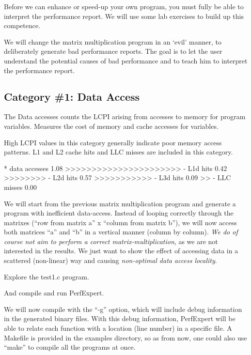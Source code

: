 Before we can enhance or speed-up your own program, you must fully be able to interpret the performance report. We will use some lab exercises to build up this competence.

We will change the matrix multiplication program in an `evil' manner, to deliberately generate bad performance reports. The goal is to let the user understand the potential causes of bad performance and to teach him to interpret the performance report.

\subsection{Category \#1: Data Access}
\label{subsec:CAT1_Data_Access}

The Data accesses counts the LCPI arising from accesses to memory for program variables. Measures the cost of memory and cache accesses for variables.

High LCPI values in this category generally indicate poor memory access patterns. L1 and L2 cache hits and LLC misses are included in this category.

\begin{prompt}
* data accesses          1.08 >>>>>>>>>>>>>>>>>>>>>>
  - L1d hits             0.42 >>>>>>>>
  - L2d hits             0.57 >>>>>>>>>>>
  - L3d hits             0.09 >>
  - LLC misses           0.00
\end{prompt}

We will start from the previous matrix multiplication program and generate a program with inefficient data-access. Instead of looping correctly through the matrixes (``row from matrix a'' x ``column from matrix b''), we will now access both matrices ``a'' and ``b'' in a vertical manner (column by column). \emph{We do of course not aim to perform a correct matrix-multiplication}, as we are not interested in the results. We just want to show the effect of accessing data in a scattered (non-linear) way and causing \emph{non-optimal data access locality}.

Explore the test1.c program.

\begin{prompt}
\end{prompt}

And compile and run PerfExpert.

We will now compile with the ``-g'' option, which will include debug information in the generated binary files. With this debug information, PerfExpert will be able to relate each function with a location (line number) in a specific file. A Makefile is provided in the examples directory, so as from now, one could also use ``make'' to compile all the programs at once.


